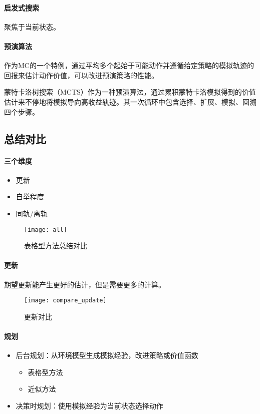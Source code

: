 \documentclass[
12pt, %
a4paper, 
oneside, %
headinclude,footinclude, %
]{scrartcl}
\begin{document}
\paragraph{启发式搜索}
聚焦于当前状态。
\paragraph{预演算法}
作为MC的一个特例，通过平均多个起始于可能动作并遵循给定策略的模拟轨迹的回报来估计动作价值，可以改进预演策略的性能。

蒙特卡洛树搜索（MCTS）作为一种预演算法，通过累积蒙特卡洛模拟得到的价值估计来不停地将模拟导向高收益轨迹。其一次循环中包含选择、扩展、模拟、回溯四个步骤。
\subsection{总结对比}
\begin{minipage}{0.3\textwidth}
\paragraph{三个维度}   
\begin{itemize}
\item 更新
\item 自举程度
\item 同轨/离轨
\end{itemize}
\end{minipage}
\hfill
\begin{minipage}{0.6\textwidth}
\begin{figure}[H]
\centering
\texttt{[image: all]}
\caption[表格型方法总结对比]{表格型方法总结对比}
\end{figure}
\end{minipage}
\paragraph{更新}
期望更新能产生更好的估计，但是需要更多的计算。

\begin{figure}[H]
\centering
\texttt{[image: compare\_update]}
\caption[表格型方法更新对比]{更新对比}
\end{figure}
\paragraph{规划}
\begin{itemize}
\item 后台规划：从环境模型生成模拟经验，改进策略或价值函数
\begin{itemize}
\item 表格型方法
\item 近似方法
\end{itemize}
\item 决策时规划：使用模拟经验为当前状态选择动作
\end{itemize}
\end{document}
